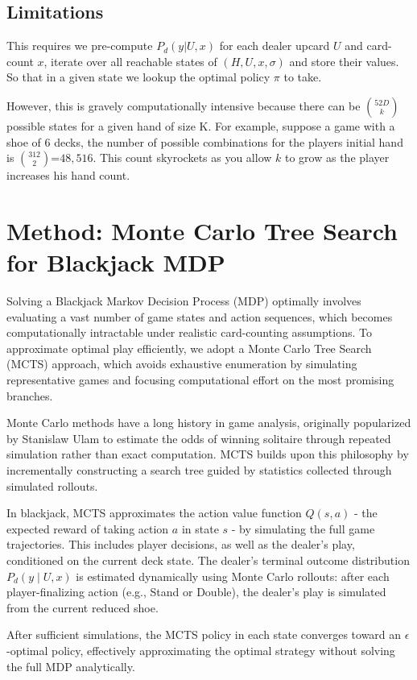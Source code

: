 \documentclass[12pt,a4paper]{cibb}
\begin{document}
\subsection{Limitations}
This requires we pre-compute $P_d(y|U, x)$ for each dealer upcard $U$ and card-count $x$, iterate over all reachable states of $(H, U, x, σ)$ and store their values. So that in a given state we lookup the optimal policy $π$ to take.

However, this is gravely computationally intensive because there can be ${52D}\choose{k}$ possible states for a given hand of size K. For example, suppose a game with a shoe of 6 decks, the number of possible combinations for the players initial hand is ${312}\choose{2}$=$48,516$. This count skyrockets as you allow $k$ to grow as the player increases his hand count.


\section{Method: Monte Carlo Tree Search for Blackjack MDP}

Solving a Blackjack Markov Decision Process (MDP) optimally involves evaluating a vast number of game states and action sequences, which becomes computationally intractable under realistic card-counting assumptions. To approximate optimal play efficiently, we adopt a Monte Carlo Tree Search (MCTS) approach, which avoids exhaustive enumeration by simulating representative games and focusing computational effort on the most promising branches.

Monte Carlo methods have a long history in game analysis, originally popularized by Stanislaw Ulam to estimate the odds of winning solitaire through repeated simulation rather than exact computation. MCTS builds upon this philosophy by incrementally constructing a search tree guided by statistics collected through simulated rollouts.

In blackjack, MCTS approximates the action value function $Q(s, a)$ - the expected reward of taking action $a$ in state $s$ - by simulating the full game trajectories. This includes player decisions, as well as the dealer's play, conditioned on the current deck state. The dealer's terminal outcome distribution $P_d(y \mid U, x)$ is estimated dynamically using Monte Carlo rollouts: after each player-finalizing action (e.g., Stand or Double), the dealer's play is simulated from the current reduced shoe.

After sufficient simulations, the MCTS policy in each state converges toward an $\epsilon$-optimal policy, effectively approximating the optimal strategy without solving the full MDP analytically.
\end{document}
